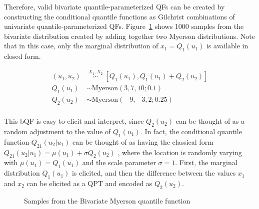 \documentclass[
  fleqn,
  deca,
  blindrev
]{informs4}
\begin{document}
Therefore, valid bivariate quantile-parameterized QFs can be created by
constructing the conditional quantile functions as Gilchrist
combinations of univariate quantile-parameterized QFs.
Figure~\ref{fig-bq-myerson} shows 1000 samples from the bivariate
distribution created by adding together two Myerson distributions. Note
that in this case, only the marginal distribution of \(x_1 = Q_1(u_1)\)
is available in closed form.

\[
\begin{aligned}
(u_1, u_2) &\overset{X_1, X_2}{\backsim} [Q_1(u_1), Q_1(u_1)+Q_2(u_2)]\\
Q_1(u_1) &\sim\text{Myerson}(3,7,10; 0.1)\\
Q_2(u_2) &\sim \text{Myerson}(-9, -3, 2; 0.25)\\
\end{aligned}
\]

This bQF is easy to elicit and interpret, since \(Q_2(u_2)\) can be
thought of as a random adjustment to the value of \(Q_1(u_1)\). In fact,
the conditional quantile function \(Q_{21}(u_2\vert u_1)\) can be
thought of as having the classical form
\(Q_{21}(u_2\vert u_1) = \mu(u_1) + \sigma Q_2(u_2)\)
\citep{gilchrist2000StatisticalModellingQuantile}, where the location is
randomly varying with \(\mu(u_1) = Q_1(u_1)\) and the scale parameter
\(\sigma = 1\). First, the marginal distribution \(Q_1(u_1)\) is
elicited, and then the difference between the values \(x_1\) and \(x_2\)
can be elicited as a QPT and encoded as \(Q_2(u_2)\).

\begin{figure}


\caption{\label{fig-bq-myerson}Samples from the Bivariate Myerson
quantile function}

\end{figure}%
\end{document}
